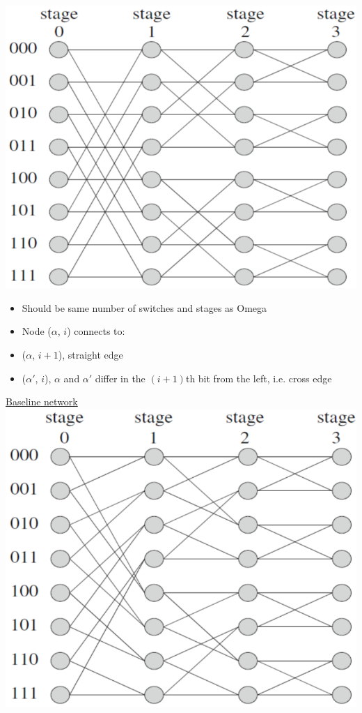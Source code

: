 \documentclass[8pt,landscape]{article}
\begin{document}
\begin{multicols}{4}
\smallbreak \noindent \includegraphics[scale=0.2]{./butterfly}
\begin{itemize}
\item Should be same number of switches and stages as Omega
					\item Node ($\alpha$, $i$) connects to:
					\item ($\alpha$, $i+1$), straight edge
					\item ($\alpha'$, $i$), $\alpha$ and $\alpha'$ differ in the $(i+1)$th bit from the left, i.e. cross edge
\end{itemize}
\smallbreak \noindent \underline{Baseline network}
\smallbreak \noindent \includegraphics[scale=0.2]{./baseline}


\end{multicols}
\end{document}
